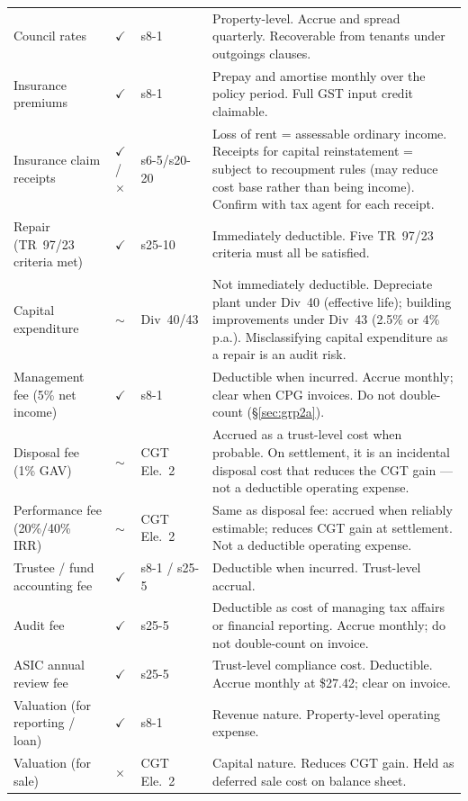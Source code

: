 \documentclass[10pt,a4paper]{article}
\begin{document}
{\begin{longtable}{@{} L{4.2cm} C{0.7cm} L{1.8cm} L{5.6cm} @{}}
Council rates & $\checkmark$ & s8-1 & Property-level. Accrue and spread quarterly. Recoverable from tenants under outgoings clauses. \\
Insurance premiums & $\checkmark$ & s8-1 & Prepay and amortise monthly over the policy period. Full GST input credit claimable. \\
Insurance claim receipts & $\checkmark$/$\times$ & s6-5/s20-20 & Loss of rent = assessable ordinary income. Receipts for capital reinstatement = subject to recoupment rules (may reduce cost base rather than being income). Confirm with tax agent for each receipt. \\
Repair (TR~97/23 criteria met) & $\checkmark$ & s25-10 & Immediately deductible. Five TR~97/23 criteria must all be satisfied. \\
Capital expenditure & $\sim$ & Div~40/43 & Not immediately deductible. Depreciate plant under Div~40 (effective life); building improvements under Div~43 (2.5\% or 4\% p.a.). Misclassifying capital expenditure as a repair is an audit risk. \\
Management fee (5\% net income) & $\checkmark$ & s8-1 & Deductible when incurred. Accrue monthly; clear when CPG invoices. Do not double-count (\S\ref{sec:grp2a}). \\
Disposal fee (1\% GAV) & $\sim$ & CGT Ele.~2 & Accrued as a trust-level cost when probable. On settlement, it is an incidental disposal cost that reduces the CGT gain --- not a deductible operating expense. \\
Performance fee (20\%/40\% IRR) & $\sim$ & CGT Ele.~2 & Same as disposal fee: accrued when reliably estimable; reduces CGT gain at settlement. Not a deductible operating expense. \\
Trustee / fund accounting fee & $\checkmark$ & s8-1 / s25-5 & Deductible when incurred. Trust-level accrual. \\
Audit fee & $\checkmark$ & s25-5 & Deductible as cost of managing tax affairs or financial reporting. Accrue monthly; do not double-count on invoice. \\
ASIC annual review fee & $\checkmark$ & s25-5 & Trust-level compliance cost. Deductible. Accrue monthly at \$27.42; clear on invoice. \\
Valuation (for reporting / loan) & $\checkmark$ & s8-1 & Revenue nature. Property-level operating expense. \\
Valuation (for sale) & $\times$ & CGT Ele.~2 & Capital nature. Reduces CGT gain. Held as deferred sale cost on balance sheet. \\

\end{longtable}}
\end{document}
